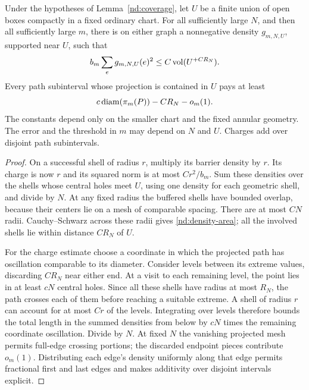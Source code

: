 \begin{lemma}\label{nd:densities}
Under the hypotheses of Lemma~\ref{nd:coverage}, let $U$ be a finite
union of open boxes compactly in a fixed ordinary chart.  For all
sufficiently large $N$, and then all sufficiently large $m$, there
is on either graph a nonnegative density $g_{m,N,U}$, supported
near $U$, such that
\begin{equation}\label{nd:density-area}
 b_m\sum_e g_{m,N,U}(e)^2
       \le C\operatorname{vol}(U^{+CR_N}).
\end{equation}
Every path subinterval whose projection is contained in $U$ pays
at least
\begin{equation}\label{nd:density-charge}
 c\operatorname{diam}(\pi_m(P))-CR_N-o_m(1).
\end{equation}
The constants depend only on the smaller chart and the fixed
annular geometry.  The error and the threshold in $m$ may depend
on $N$ and $U$.  Charges add over disjoint path subintervals.
\end{lemma}

\begin{proof}
On a successful shell of radius $r$, multiply its barrier density
by $r$.  Its charge is now $r$ and its squared norm is at most
$Cr^2/b_m$.  Sum these densities over the shells whose central
holes meet $U$, using one density for each geometric shell, and
divide by $N$.  At any fixed radius the buffered shells have
bounded overlap, because their centers lie on a mesh of comparable
spacing.  There are at most $CN$ radii.  Cauchy--Schwarz across
these radii gives \eqref{nd:density-area}; all the involved shells
lie within distance $CR_N$ of $U$.

For the charge estimate choose a coordinate in which the projected
path has oscillation comparable to its diameter.  Consider levels
between its extreme values, discarding $CR_N$ near either end.
At a visit to each remaining level, the point lies in at least
$cN$ central holes.  Since all these shells have radius at most
$R_N$, the path crosses each of them before reaching a suitable
extreme.  A shell of radius $r$ can account for at most $Cr$ of
the levels.  Integrating over levels therefore bounds the total
length in the summed densities from below by $cN$ times the
remaining coordinate oscillation.  Divide by $N$.  At fixed $N$
the vanishing projected mesh permits full-edge crossing portions;
the discarded endpoint pieces contribute $o_m(1)$.  Distributing
each edge's density uniformly along that edge permits fractional
first and last edges and makes additivity over disjoint intervals
explicit.
\end{proof}

